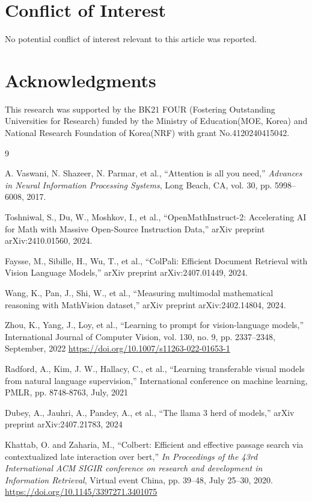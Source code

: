 \documentclass[a4paper,twoside,flushend, 10pt]{article}
\begin{document}
\section*{Conflict of Interest}
\noindent
No potential conflict of interest relevant to this article was reported.

\section*{Acknowledgments}
\noindent
This research was supported by the BK21 FOUR (Fostering Outstanding Universities for Research) funded by the Ministry of Education(MOE, Korea) and National Research Foundation of Korea(NRF) with grant No.4120240415042.



\begin{thebibliography}{9}

A. Vaswani, N. Shazeer, N. Parmar, et al.,
``Attention is all you need,'' \emph{Advances in Neural Information Processing Systems}, Long Beach, CA, vol. 30, pp. 5998--6008, 2017.

Toshniwal, S., Du, W., Moshkov, I., et al.,
``OpenMathInstruct-2: Accelerating AI for Math with Massive Open-Source Instruction Data,'' arXiv preprint arXiv:2410.01560, 2024.

Faysse, M., Sibille, H., Wu, T., et al., 
``ColPali: Efficient Document Retrieval with Vision Language Models,'' arXiv preprint arXiv:2407.01449, 2024.

Wang, K., Pan, J., Shi, W., et al.,
``Measuring multimodal mathematical reasoning with MathVision dataset,'' arXiv preprint arXiv:2402.14804, 2024.

Zhou, K., Yang, J., Loy, et al., ``Learning to prompt for vision-language models,'' International Journal of Computer Vision, vol. 130, no. 9, pp. 2337--2348, September, 2022 \href{https://doi.org/10.1007/s11263-022-01653-1}{https://doi.org/10.1007/s11263-022-01653-1}

Radford, A., Kim, J. W., Hallacy, C., et al., ``Learning transferable visual models from natural language supervision,'' International conference on machine learning, PMLR, pp. 8748-8763, July, 2021

Dubey, A., Jauhri, A., Pandey, A., et al., ``The llama 3 herd of models,'' arXiv preprint arXiv:2407.21783, 2024

Khattab, O. and Zaharia, M., ``Colbert: Efficient and effective passage search via contextualized late interaction over bert,''  \emph{In Proceedings of the 43rd International ACM SIGIR conference on research and development in Information Retrieval}, Virtual event China, pp. 39--48, July 25--30, 2020. \href{https://doi.org/10.1145/3397271.3401075}{https://doi.org/10.1145/3397271.3401075}


\end{thebibliography}
\end{document}
